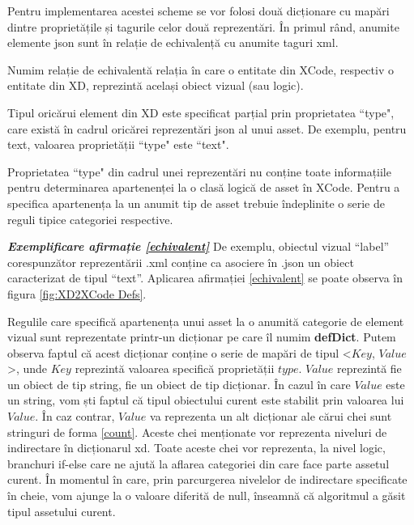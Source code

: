 Pentru implementarea acestei scheme se vor folosi două dicționare cu mapări dintre proprietățile și tagurile celor două reprezentări. 
În primul rând, anumite elemente json sunt în relație de echivalență cu anumite taguri xml. 
\\

\begin{mydef}\label{echivalent}
Numim relație de echivalentă relația în care o entitate din XCode, respectiv o entitate din XD, reprezintă același obiect vizual (sau logic).\\
\end{mydef}

\begin{myNote}\label{tip}
Tipul oricărui element din XD este specificat parțial prin proprietatea ``type", care există în cadrul oricărei reprezentări json al unui asset. De exemplu, pentru text, valoarea proprietății ``type" este ``text".\\
\end{myNote}

\begin{myNote}\label{echivalent}
Proprietatea ``type" din cadrul unei reprezentări nu conține toate informațiile pentru determinarea apartenenței la o clasă logică de asset în XCode. Pentru a specifica apartenența la un anumit tip de asset trebuie îndeplinite o serie de reguli tipice categoriei respective.\\
\end{myNote}

\textbf{\textit{Exemplificare afirmație \ref{echivalent}}} De exemplu, obiectul vizual “label” corespunzător reprezentării .xml conține ca asociere în .json un obiect caracterizat de tipul “text”. Aplicarea afirmației \ref{echivalent} se poate observa în figura \ref{fig:XD2XCode Defs}. 

Regulile care specifică apartenența unui asset la o anumită categorie de element vizual sunt reprezentate printr-un dicționar pe care îl numim \textbf{defDict}. Putem observa faptul că acest dicționar conține o serie de mapări de tipul <$Key$, $Value$>, unde $Key$ reprezintă valoarea specifică proprietății $type$. $Value$ reprezintă fie un obiect de tip string, fie un obiect de tip dicționar. În cazul în care $Value$ este un string, vom ști faptul că tipul obiectului curent este stabilit prin valoarea lui $Value$. În caz contrar, $Value$ va reprezenta un alt dicționar ale cărui chei sunt stringuri de forma \ref{count}. Aceste chei menționate vor reprezenta niveluri de indirectare în dicționarul xd. Toate aceste chei vor reprezenta, la nivel logic, branchuri if-else care ne ajută la aflarea categoriei din care face parte assetul curent. În momentul în care, prin parcurgerea nivelelor de indirectare specificate în cheie, vom ajunge la o valoare diferită de null, înseamnă că algoritmul a găsit tipul assetului curent.\\

